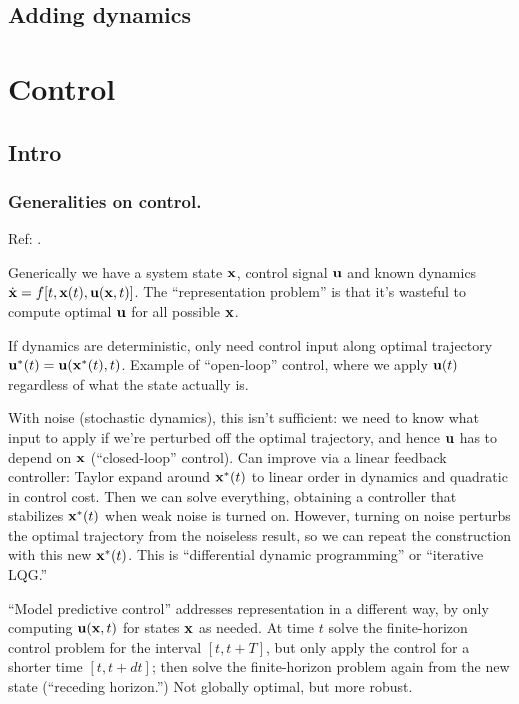 \documentclass[notitlepage,openany,11pt]{report}
\numberwithin{equation}{section}
\theoremstyle{plain}%
\begin{document}
\section{Adding dynamics}




\chapter{Control}

\section{Intro}

\subsection{Generalities on control.}
Ref: \cite{KappenRuiz:16}.

Generically we have a system state $\mathbf{x}$, control signal $\mathbf{u}$ and known dynamics $\dot{\mathbf{x}} = f[t, \mathbf{x}(t), \mathbf{u}(\mathbf{x},t)]$. The ``representation problem'' is that it's wasteful to compute optimal $\mathbf{u}$ for all possible $\mathbf{x}$.

If dynamics are deterministic, only need control input along optimal trajectory $\mathbf{u}^{\ast}(t) = \mathbf{u}(\mathbf{x}^{\ast}(t), t)$. Example of ``open-loop'' control, where we apply $\mathbf{u}(t)$ regardless of what the state actually is. 

With noise (stochastic dynamics), this isn't sufficient: we need to know what input to apply if we're perturbed off the optimal trajectory, and hence $\mathbf{u}$ has to depend on $\mathbf{x}$ (``closed-loop'' control). Can improve via a linear feedback controller: Taylor expand around $\mathbf{x}^{\ast}(t)$ to linear order in dynamics and quadratic in control cost. Then we can solve everything, obtaining a controller that stabilizes $\mathbf{x}^{\ast}(t)$ when weak noise is turned on. However, turning on noise perturbs the optimal trajectory from the noiseless result, so we can repeat the construction with this new $\mathbf{x}^{\ast}(t)$. This is ``differential dynamic programming'' or ``iterative LQG.''

``Model predictive control'' addresses representation in a different way, by only computing $\mathbf{u}(\mathbf{x},t)$ for states $\mathbf{x}$ as needed. At time $t$ solve the finite-horizon control problem for the interval  $[t, t+T]$, but only apply the control for a shorter time $[t, t+dt]$; then solve the finite-horizon problem again from the new state (``receding horizon.'') Not globally optimal, but more robust.
\end{document}
